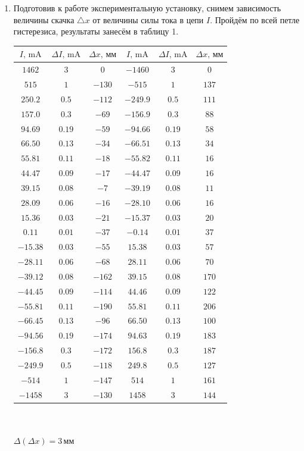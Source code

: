 \documentclass[a4paper]{article}
\begin{document}
\begin{enumerate}
    \item Подготовив к работе экспериментальную установку, снимем зависимость величины скачка $\triangle x$ от величины силы тока в цепи $I$. Пройдём по всей петле гистерезиса, результаты занесём в таблицу 1.

    \begin{center}
\begin{tabular}{|c|c|c|c|c|c|}\hline
$I\text{, mA}$&$\Delta I\text{, mA}$&$\Delta x\text{, мм}$&$I\text{, mA}$&$\Delta I\text{, mA}$&$\Delta x\text{, мм}$\\\hline
$1462$&$3$&$0$&$-1460$&$3$&$0$\\\hline
$515$&$1$&$-130$&$-515$&$1$&$137$\\\hline
$250.2$&$0.5$&$-112$&$-249.9$&$0.5$&$111$\\\hline
$157.0$&$0.3$&$-69$&$-156.9$&$0.3$&$88$\\\hline
$94.69$&$0.19$&$-59$&$-94.66$&$0.19$&$58$\\\hline
$66.50$&$0.13$&$-34$&$-66.51$&$0.13$&$34$\\\hline
$55.81$&$0.11$&$-18$&$-55.82$&$0.11$&$16$\\\hline
$44.47$&$0.09$&$-17$&$-44.47$&$0.09$&$16$\\\hline
$39.15$&$0.08$&$-7$&$-39.19$&$0.08$&$11$\\\hline
$28.09$&$0.06$&$-16$&$-28.10$&$0.06$&$16$\\\hline
$15.36$&$0.03$&$-21$&$-15.37$&$0.03$&$20$\\\hline
$0.11$&$0.01$&$-37$&$-0.14$&$0.01$&$37$\\\hline
$-15.38$&$0.03$&$-55$&$15.38$&$0.03$&$57$\\\hline
$-28.11$&$0.06$&$-68$&$28.11$&$0.06$&$70$\\\hline
$-39.12$&$0.08$&$-162$&$39.15$&$0.08$&$170$\\\hline
$-44.45$&$0.09$&$-114$&$44.46$&$0.09$&$122$\\\hline
$-55.81$&$0.11$&$-190$&$55.81$&$0.11$&$206$\\\hline
$-66.45$&$0.13$&$-96$&$66.50$&$0.13$&$100$\\\hline
$-94.56$&$0.19$&$-174$&$94.63$&$0.19$&$183$\\\hline
$-156.8$&$0.3$&$-172$&$156.8$&$0.3$&$187$\\\hline
$-249.9$&$0.5$&$-118$&$249.8$&$0.5$&$127$\\\hline
$-514$&$1$&$-147$&$514$&$1$&$161$\\\hline
$-1458$&$3$&$-130$&$1458$&$3$&$144$\\\hline
\end{tabular}\\~\\
$\Delta (\Delta x)=3\,\text{мм}$
\end{center}



\end{enumerate}
\end{document}
